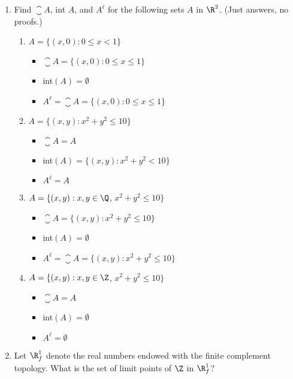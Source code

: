 \documentclass[letterpaper]{article}
\begin{document}
\begin{enumerate}
\item Find $\closure{A}$, int $A$, and $A^\ell$ for the following sets $A$ in $\R^2$. (Just answers, no proofs.)
	\begin{enumerate}[label=(\alph*)]
	\item $A=\{(x,0): 0 \leq x < 1\}$
		\begin{itemize}
		\item $\closure{A} = \{(x,0): 0 \leq x \leq 1\}$
		\item int$(A) = \emptyset$
		\item $A^\ell = \closure{A} = \{(x,0): 0 \leq x \leq 1\}$
		\end{itemize}
	\item $A=\{(x,y):x^2+y^2\leq10\}$
		\begin{itemize}
		\item $\closure{A} = A$
		\item int$(A) = \{(x,y):x^2+y^2<10\}$
		\item $A^\ell = A$
		\end{itemize}
	\item $A=\{(x,y):x,y\in\Q$, $x^2+y^2\leq10\}$
		\begin{itemize}
		\item $\closure{A} = \{(x,y):x^2+y^2\leq10\}$
		\item int$(A) = \emptyset$
		\item $A^\ell = \closure{A} = \{(x,y):x^2+y^2\leq10\}$
		\end{itemize}
	\item $A=\{(x,y):x,y\in\Z$, $x^2+y^2\leq10\}$
		\begin{itemize}
		\item $\closure{A} = A$
		\item int$(A) = \emptyset$
		\item $A^\ell = \emptyset$
		\end{itemize}
	\end{enumerate}

\item Let $\R_f^1$ denote the real numbers endowed with the finite complement topology. What is the set of limit points of $\Z$ in $\R_f^1$?


\end{enumerate}
\end{document}
